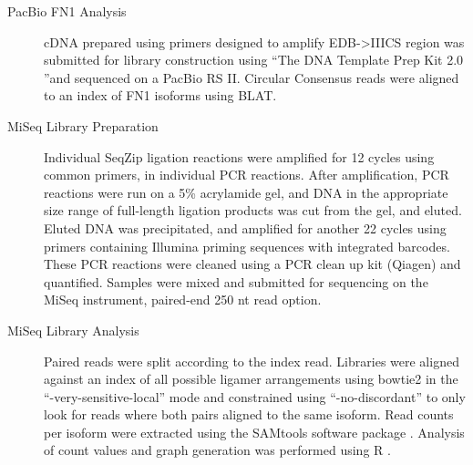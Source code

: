 \begin{description}
		\item[PacBio FN1 Analysis] 
		cDNA prepared using primers designed to amplify EDB->IIICS region was submitted for library construction using ``The DNA Template Prep Kit 2.0 ''and sequenced on a PacBio RS II. Circular Consensus reads were aligned to an index of FN1 isoforms using BLAT. 

		\item[MiSeq Library Preparation] 
		Individual SeqZip ligation reactions were amplified for 12 cycles using common primers, in individual PCR reactions. After amplification, PCR reactions were run on a 5\% acrylamide gel, and DNA in the appropriate size range of full-length ligation products was cut from the gel, and eluted. Eluted DNA was precipitated, and amplified for another 22 cycles using primers containing Illumina priming sequences with integrated barcodes. These PCR reactions were cleaned using a PCR clean up kit (Qiagen) and quantified. Samples were mixed and submitted for sequencing on the MiSeq instrument, paired-end 250 nt read option.

		\item[MiSeq Library Analysis] 
		Paired reads were split according to the index read. Libraries were aligned against an index of all possible \dscam{} ligamer arrangements using bowtie2 \citep{Langmead2012} in the ``-very-sensitive-local'' mode and constrained using ``-no-discordant'' to only look for reads where both pairs aligned to the same isoform. Read counts per isoform were extracted using the SAMtools software package \citep{Li2009d}. Analysis of count values and graph generation was performed using R \citep{RDevelopmentCoreTeam2011}.
		

\end{description}
